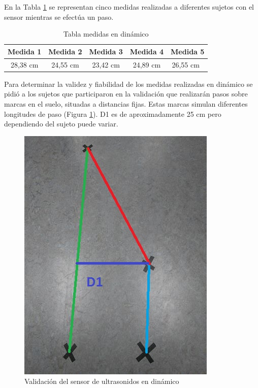 En la Tabla \ref{tabla:medidas 80 cm} se representan cinco medidas realizadas a diferentes sujetos con el sensor mientras se efectúa un paso.

\begin{table}[H]
	\centering
	\begin{tabular}[t]{|c|c|c|c|c|}
		\hline
		Medida 1 & Medida 2 & Medida 3 & Medida 4 & Medida 5\\
		\hline
		28,38 cm & 24,55 cm & 23,42 cm & 24,89 cm & 26,55 cm \\
		\hline
		
	\end{tabular}
	\caption{Tabla medidas en dinámico}
	\label{tabla:medidas 80 cm}
\end{table}

Para determinar la validez y fiabilidad de los medidas realizadas en dinámico se pidió a los sujetos que participaron en la validación que realizarán pasos sobre marcas en el suelo, situadas a distancias fijas. Estas marcas simulan diferentes longitudes de paso (Figura \ref{fig:marcas}). D1 es de aproximadamente 25 cm pero dependiendo del sujeto puede variar.

\begin{figure}[H]
	\centering
	\includegraphics[width=10 cm,height=11 cm]{./graphics/marcas}
	\caption{Validación del sensor de ultrasonidos en dinámico} \label{fig:marcas}
	
\end{figure}

